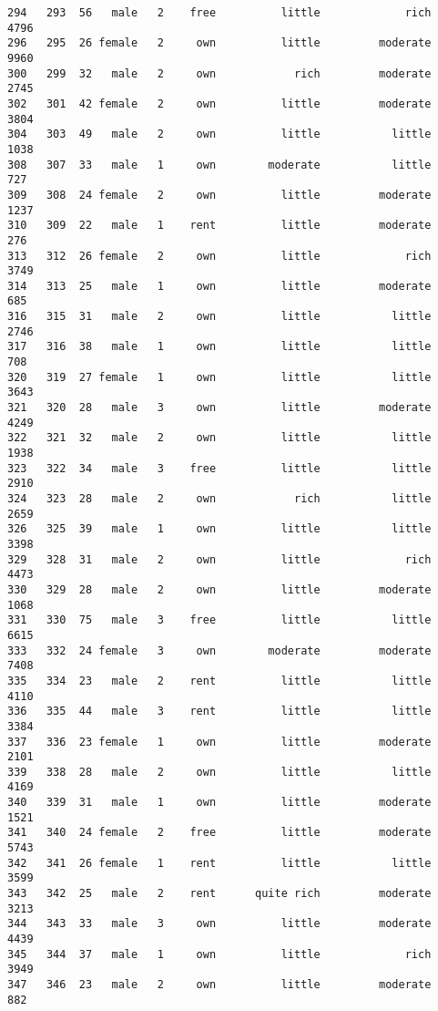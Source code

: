 \documentclass[
]{article}
\begin{document}
\begin{verbatim}
294   293  56   male   2    free          little             rich          4796
296   295  26 female   2     own          little         moderate          9960
300   299  32   male   2     own            rich         moderate          2745
302   301  42 female   2     own          little         moderate          3804
304   303  49   male   2     own          little           little          1038
308   307  33   male   1     own        moderate           little           727
309   308  24 female   2     own          little         moderate          1237
310   309  22   male   1    rent          little         moderate           276
313   312  26 female   2     own          little             rich          3749
314   313  25   male   1     own          little         moderate           685
316   315  31   male   2     own          little           little          2746
317   316  38   male   1     own          little           little           708
320   319  27 female   1     own          little           little          3643
321   320  28   male   3     own          little         moderate          4249
322   321  32   male   2     own          little           little          1938
323   322  34   male   3    free          little           little          2910
324   323  28   male   2     own            rich           little          2659
326   325  39   male   1     own          little           little          3398
329   328  31   male   2     own          little             rich          4473
330   329  28   male   2     own          little         moderate          1068
331   330  75   male   3    free          little           little          6615
333   332  24 female   3     own        moderate         moderate          7408
335   334  23   male   2    rent          little           little          4110
336   335  44   male   3    rent          little           little          3384
337   336  23 female   1     own          little         moderate          2101
339   338  28   male   2     own          little           little          4169
340   339  31   male   1     own          little         moderate          1521
341   340  24 female   2    free          little         moderate          5743
342   341  26 female   1    rent          little           little          3599
343   342  25   male   2    rent      quite rich         moderate          3213
344   343  33   male   3     own          little         moderate          4439
345   344  37   male   1     own          little             rich          3949
347   346  23   male   2     own          little         moderate           882

\end{verbatim}
\end{document}
